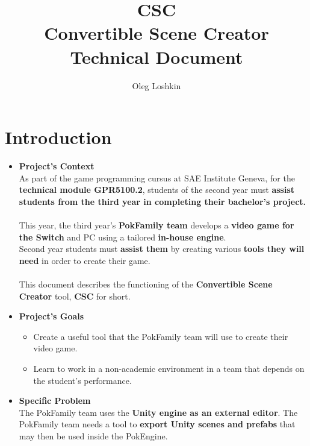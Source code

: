 \documentclass[12pt,a4paper]{article}
\author{Oleg Loshkin}
\title{\textbf{CSC}\\Convertible Scene Creator\\\textbf{Technical Document}}
\begin{document}
\maketitle
\section{Introduction}
	\begin{itemize}
		\item \textbf{Project's Context}
		\\As part of the game programming cursus at SAE Institute Geneva, for the \textbf{technical module GPR5100.2}, students of the second year must \textbf{assist students from the third year in completing their bachelor’s project.}\\\\
		This year, the third year's \textbf{PokFamily team} develops a \textbf{video game for the Switch} and PC using a tailored \textbf{in-house engine}.\\Second year students must \textbf{assist them} by creating various \textbf{tools they will need} in order to create their game.\\\\
		This document describes the functioning of the \textbf{Convertible Scene Creator} tool, \textbf{CSC} for short.
		
		\item \textbf{Project's Goals}
			\begin{itemize}
				\item Create a useful tool that the PokFamily team will use to create their video game.
				
				\item Learn to work in a non-academic environment in a team that depends on the student’s performance.
				
			\end{itemize}
			
		\item \textbf{Specific Problem}
		\\The PokFamily team uses the \textbf{Unity engine as an external editor}. The PokFamily team needs a tool to \textbf{export Unity scenes and prefabs} that may then be used inside the PokEngine.
	\end{itemize}
\newpage
\end{document}
